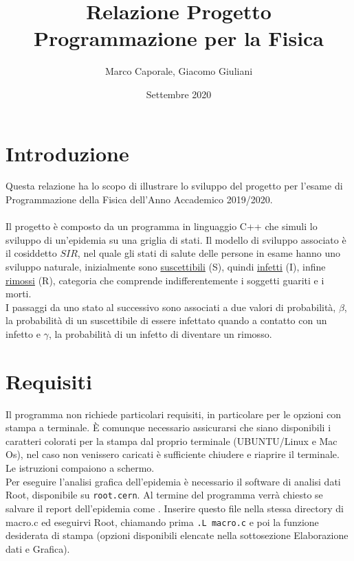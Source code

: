 \documentclass[a4paper]{article}
\begin{document}
\title{Relazione Progetto Programmazione per la Fisica}
\author{Marco Caporale, Giacomo Giuliani}
\date{Settembre 2020}
\maketitle

\section{Introduzione}
Questa relazione ha lo scopo di illustrare lo sviluppo del progetto per l'esame di Programmazione della Fisica dell'Anno Accademico 2019/2020. \\ \\ Il progetto è composto da un programma in linguaggio C++ che simuli lo sviluppo di un'epidemia su una griglia di stati. Il modello di sviluppo associato è il cosiddetto $SIR$, nel quale gli stati di salute delle persone in esame hanno uno sviluppo naturale, inizialmente sono \underline{suscettibili} (S), quindi \underline{infetti} (I), infine \underline{rimossi} (R), categoria che comprende indifferentemente i soggetti guariti e i morti. \\ I passaggi da uno stato al successivo sono associati a due valori di probabilità, $\beta$, la probabilità di un suscettibile di essere infettato quando a contatto con un infetto e $\gamma$, la probabilità di un infetto di diventare un rimosso. \\ 

\section{Requisiti}
Il programma non richiede particolari requisiti, in particolare per le opzioni con stampa a terminale. \`E comunque necessario assicurarsi che siano disponibili i caratteri colorati per la stampa dal proprio terminale (UBUNTU/Linux e Mac Os), nel caso non venissero caricati è sufficiente chiudere e riaprire il terminale.\\
Le istruzioni compaiono a schermo.\\
Per eseguire l'analisi grafica dell'epidemia è necessario il software di analisi dati Root, disponibile su \texttt{root.cern}.
Al termine del programma verrà chiesto se salvare il report dell'epidemia come . Inserire questo file nella stessa directory di macro.c ed eseguirvi Root, chiamando prima \texttt{.L macro.c} e poi la funzione desiderata di stampa (opzioni disponibili elencate nella sottosezione Elaborazione dati e Grafica).
\end{document}
